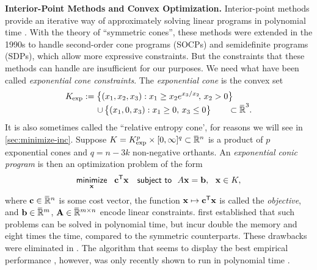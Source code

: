 \textbf{Interior-Point Methods and Convex Optimization.}
Interior-point methods provide an iterative way of approximately solving linear programs in polynomial time \parencite{karmarkar1984new}.
With the theory of ``symmetric cones'', these methods were extended in the 1990s to handle second-order cone programs (SOCPs) and semidefinite programs (SDPs), which allow more expressive constraints.
But the constraints that these methods can handle are insufficient for
our purposes. We need what have been called \emph{exponential cone constraints}.
The \emph{exponential cone} is the convex set
\begin{align*}
        \begin{aligned}
        K_{\mskip-1mu\exp} :=
        \big\{ (x_1, x_2, x_3) &:
                x_1 \ge x_2 e^{x_3 / x_2}\!,\, x_2 > 0 \big\}
            \\[-0.6ex]\quad \mathbin{\cup}\,
        \big\{ (x_1, 0, x_3&) : x_1 \ge 0,\, x_3 \le 0 \big\}
        \qquad \subset \mathbb {\mskip1mu\overline{\mskip-1mu\mathbb R\!}\,}^3.
    \end{aligned}
\end{align*}
It is also sometimes called the ``relative entropy cone', for reasons we will see in \cref{sec:minimize-inc}.
Suppose $K  =  K_{\exp}^p  \times [0, \infty]^q 
\subset \smash{\mskip1mu\overline{\mskip-1mu\mathbb R\!}\,}^n$ is a product of $p$ exponential cones and $q = n - 3k$ non-negative orthants.
An \emph{exponential conic program} is then an optimization problem of the form
\begin{equation}
    \minimize
        _{\mat x}
        ~~ \mat c^{\sf T} \mat x
    \quad\subjto
    ~~ A \mat x = \mat b,~~\mat x \in 
        K,
        \label{eq:exp-conic-program}
\end{equation}
where $\mathbf c \in \mskip1mu\overline{\mskip-1mu\mathbb R\!}\,^{n}$ is some cost vector,
the function $\mathbf x \mapsto \mathbf c^{\sf T} \mathbf x$ is called the \emph{objective},
and $\mathbf b \in \mskip1mu\overline{\mskip-1mu\mathbb R\!}\,^m$, $\mathbf A \in \mskip1mu\overline{\mskip-1mu\mathbb R\!}\,^{m \times n}$ encode linear constraints.
\textcite*{nesterov1996infeasible} first established that such problems can be solved in polynomial time, but incur double the memory and eight times the time, compared to the symmetric counterparts. These drawbacks were eliminated in \cite{skajaa2015homogeneous}.
The algorithm that seems to display the best empirical performance \parencite{dahl2022primal}, however, was only recently shown to
run in polynomial time \parencite{badenbroek2021algorithm}.

